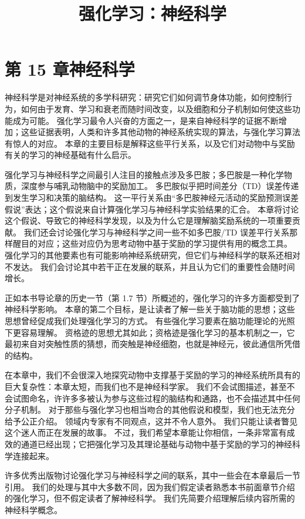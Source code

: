\documentclass[UTF8, 12pt, fontset=fandol, oneside]{ctexart}
\title{强化学习：神经科学}
\author{}
\date{}
\begin{document}
\maketitle

\section*{第 15 章\quad 神经科学}

神经科学是对神经系统的多学科研究：研究它们如何调节身体功能，如何控制行为，如何由于发育、学习和衰老而随时间改变，以及细胞和分子机制如何使这些功能成为可能。
强化学习最令人兴奋的方面之一，是来自神经科学的证据不断增加；这些证据表明，人类和许多其他动物的神经系统实现的算法，与强化学习算法有惊人的对应。
本章的主要目标是解释这些平行关系，以及它们对动物中与奖励有关的学习的神经基础有什么启示。

强化学习与神经科学之间最引人注目的接触点涉及多巴胺；多巴胺是一种化学物质，深度参与哺乳动物脑中的奖励加工。
多巴胺似乎把时间差分（TD）误差传递到发生学习和决策的脑结构。
这一平行关系由“多巴胺神经元活动的奖励预测误差假说”表达；这个假说来自计算强化学习与神经科学实验结果的汇合。
本章将讨论这个假说、导致它的神经科学发现，以及为什么它是理解脑奖励系统的一项重要贡献。
我们还会讨论强化学习与神经科学之间一些不如多巴胺/TD 误差平行关系那样醒目的对应；这些对应仍为思考动物中基于奖励的学习提供有用的概念工具。
强化学习的其他要素也有可能影响神经系统研究，但它们与神经科学的联系还相对不发达。
我们会讨论其中若干正在发展的联系，并且认为它们的重要性会随时间增长。

正如本书导论章的历史一节（第 1.7 节）所概述的，强化学习的许多方面都受到了神经科学影响。
本章的第二个目标，是让读者了解一些关于脑功能的思想；这些思想曾经促成我们处理强化学习的方式。
有些强化学习要素在脑功能理论的光照下更容易理解。
资格迹的思想尤其如此；资格迹是强化学习的基本机制之一，它最初来自对突触性质的猜想，而突触是神经细胞，也就是神经元，彼此通信所凭借的结构。

在本章中，我们不会很深入地探究动物中支撑基于奖励的学习的神经系统所具有的巨大复杂性：本章太短，而我们也不是神经科学家。
我们不会试图描述，甚至不会试图命名，许许多多被认为参与这些过程的脑结构和通路，也不会描述其中任何分子机制。
对于那些与强化学习也相当吻合的其他假说和模型，我们也无法充分给予公正介绍。
领域内专家有不同观点，这并不令人意外。
我们只能让读者瞥见这个迷人而正在发展的故事。
不过，我们希望本章能让你相信，一条非常富有成效的通道已经出现；它把强化学习及其理论基础与动物中基于奖励的学习的神经科学连接起来。

许多优秀出版物讨论强化学习与神经科学之间的联系，其中一些会在本章最后一节引用。
我们的处理与其中大多数不同，因为我们假定读者熟悉本书前面章节介绍的强化学习，但不假定读者了解神经科学。
我们先简要介绍理解后续内容所需的神经科学概念。
\end{document}
